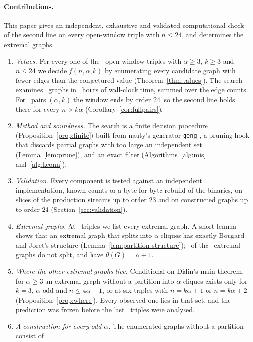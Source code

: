 \documentclass[11pt]{article}
\theoremstyle{definition}
\theoremstyle{remark}
\begin{document}
\paragraph{Contributions.} This paper gives an independent, exhaustive and validated computational check of the
second line on every open-window triple with $n\le24$, and determines the extremal graphs.
\begin{enumerate}
\item \emph{Values.} For every one of the \ntriples\ open-window triples with $\alpha\ge3$, $k\ge3$ and $n\le24$ we
decide $f(n,\alpha,k)$ by enumerating every candidate graph with fewer edges than the conjectured value
(Theorem~\ref{thm:values}). The search examines \ngraphs\ graphs in \nhours\ hours of wall-clock time, summed over the edge counts. For
\nfullpairs\ pairs $(\alpha,k)$ the window ends by order 24, so the second line holds there for every $n>k\alpha$
(Corollary~\ref{cor:fullpairs}).
\item \emph{Method and soundness.} The search is a finite decision procedure (Proposition~\ref{prop:finite}) built
from nauty's generator \texttt{geng} \cite{nauty,McKay98}, a pruning hook that discards partial graphs with too large
an independent set (Lemma~\ref{lem:prune}), and an exact filter (Algorithms~\ref{alg:mis} and~\ref{alg:kconn}).
\item \emph{Validation.} Every component is tested against an independent implementation, known counts or a
byte-for-byte rebuild of the binaries, on slices of the production streams up to order 23 and on constructed graphs up
to order 24 (Section~\ref{sec:validation}).
\item \emph{Extremal graphs.} At \nexttriples\ triples we list every extremal graph. A short lemma shows that an
extremal graph that splits into $\alpha$ cliques has exactly Bougard and Joret's structure
(Lemma~\ref{lem:partition-structure}); \nnopart\ of the \nextremal\ extremal graphs do not split, and have
$\theta(G)=\alpha+1$.
\item \emph{Where the other extremal graphs live.} Conditional on Didin's main theorem, for $\alpha\ge3$ an
extremal graph without a partition into $\alpha$ cliques exists only for $k=3$, $\alpha$ odd and $n\le4\alpha-1$, or at six triples with
$n=k\alpha+1$ or $n=k\alpha+2$ (Proposition~\ref{prop:where}). Every observed one lies in that set, and the
prediction was frozen before the last \nphasetwotriples\ triples were analysed.
\item \emph{A construction for every odd $\alpha$.} The enumerated graphs without a partition consist of

\end{enumerate}
\end{document}
